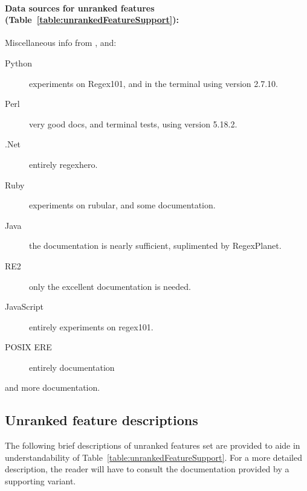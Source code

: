 \begin{footnotesize}
\paragraph{Data sources for unranked features (Table~\ref{table:unrankedFeatureSupport}):}
Miscellaneous info from , and:
\begin{description}
\item[Python] experiments on Regex101, and in the terminal using version 2.7.10.
\item[Perl] very good docs, and terminal tests, using version 5.18.2.
\item[.Net] entirely regexhero.
\item[Ruby] experiments on rubular, and some documentation.
\item[Java] the documentation is nearly sufficient, suplimented by RegexPlanet.
\item[RE2] only the excellent documentation is needed.
\item[JavaScript] entirely experiments on regex101.
\item[POSIX ERE] entirely documentation
\end{description} and more documentation.
\end{footnotesize}



\subsection*{Unranked feature descriptions}
\label{app:unrankedDescriptions}
The following  brief descriptions of unranked features set are provided to aide in understandability of Table~\ref{table:unrankedFeatureSupport}.  For a more detailed description, the reader will have to consult the documentation provided by a supporting variant.

